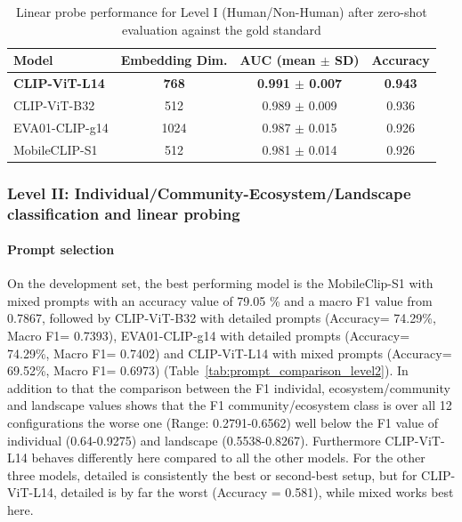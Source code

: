 \documentclass[11pt]{article}
\renewcommand{\_}{\textunderscore\allowbreak{}}
\begin{document}
\begin{table}[htbp]
\centering\small
\caption{Linear probe performance for Level I (Human/Non-Human) after zero-shot evaluation against the gold standard}
\label{tab:linearprobe_humannonhuman}
\begin{tabular}{@{}lccc@{}}
\toprule
\textbf{Model} & \textbf{Embedding Dim.} & \textbf{AUC (mean $\pm$ SD)} & \textbf{Accuracy} \\
\midrule
\textbf{CLIP-ViT-L14} & \textbf{768}  & \textbf{0.991 $\pm$ 0.007} & \textbf{0.943} \\
CLIP-ViT-B32              & 512  & 0.989 $\pm$ 0.009 & 0.936 \\
EVA01-CLIP-g14            & 1024 & 0.987 $\pm$ 0.015 & 0.926 \\
MobileCLIP-S1             & 512  & 0.981 $\pm$ 0.014 & 0.926 \\
\bottomrule
\end{tabular}
\end{table}

\subsubsection{Level II: Individual/Community-Ecosystem/Landscape classification and linear probing}

\paragraph{Prompt selection}

On the development set, the best performing model is the MobileClip-S1 with mixed prompts with an accuracy value of 79.05 \% and a macro F1 value from 0.7867, followed by CLIP-ViT-B32 with detailed prompts (Accuracy= 74.29\%, Macro F1= 0.7393), EVA01-CLIP-g14 with detailed prompts (Accuracy= 74.29\%, Macro F1= 0.7402) and CLIP-ViT-L14 with mixed prompts (Accuracy= 69.52\%, Macro F1= 0.6973) (Table~\ref{tab:prompt_comparison_level2}). In addition to that the comparison between the F1 individal, ecosystem/community and landscape values shows that the F1 community/ecosystem class is over all 12 configurations the worse one (Range: 0.2791-0.6562) well below the F1 value of individual (0.64-0.9275) and landscape (0.5538-0.8267). Furthermore CLIP-ViT-L14 behaves differently here compared to all the other models. For the other three models, detailed is consistently the best or second-best setup, but for CLIP-ViT-L14, detailed is by far the worst (Accuracy = 0.581), while mixed works best here.
\end{document}
